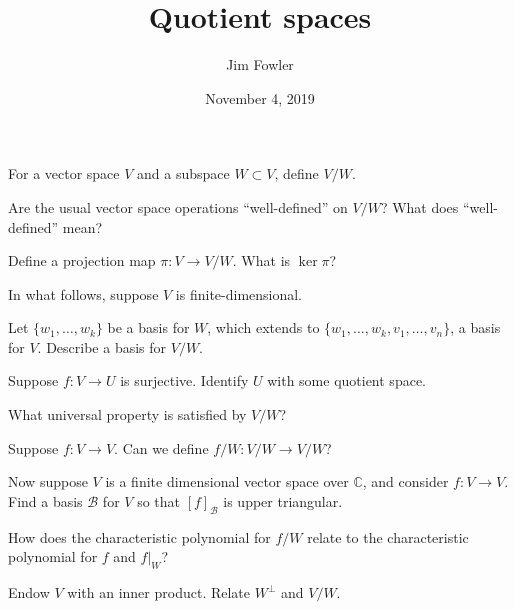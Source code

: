 \documentclass{homework}
\author{Jim Fowler}
\title{Quotient spaces}
\date{November 4, 2019}
\begin{document}
\maketitle

\begin{problem}
  For a vector space $V$ and a subspace $W \subset V$, define $V/W$.
\end{problem}

\vfill

\begin{problem}
  Are the usual vector space operations ``well-defined'' on $V/W$?  What does ``well-defined'' mean?
\end{problem}

\vfill

\begin{problem}
  Define a projection map $\pi : V \to V / W$.  What is $\ker \pi$?
\end{problem}

\vfill

\begin{problem}
  In what follows, suppose $V$ is finite-dimensional.
  
  Let $\{w_1,\ldots,w_k\}$ be a basis for $W$, which extends to $\{w_1,\ldots,w_k,v_1,\ldots,v_n\}$, a basis for $V$.  Describe a basis for $V/W$.
\end{problem}

\vfill

\begin{problem}
  Suppose $f : V \to U$ is surjective.  Identify $U$ with some quotient space.
\end{problem}

\vfill

\begin{problem}
  What universal property is satisfied by $V/W$?
\end{problem}

\vfill

\begin{problem}
  Suppose $f : V \to V$.  Can we define $f / W : V/W \to V/W$?  
\end{problem}

\vfill


\begin{problem}
  Now suppose $V$ is a finite dimensional vector space over
  $\mathbb{C}$, and consider $f : V \to V$.  Find a basis
  $\mathcal{B}$ for $V$ so that $[f]_{\mathcal{B}}$ is upper
  triangular.
\end{problem}

\vfill

\begin{problem}
  How does the characteristic polynomial for $f/W$ relate to the characteristic polynomial for $f$ and $f|_W$?
\end{problem}

\vfill

\begin{problem}
  Endow $V$ with an inner product.  Relate $W^\perp$ and $V/W$.
\end{problem}
\end{document}
